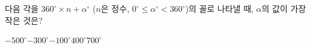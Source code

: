 다음 각을 $360^\circ\times n+\alpha^\circ$ ($n$은 정수, $0^\circ\le\alpha^\circ<360^\circ$)의 꼴로 나타낼 때, $\alpha$의 값이 가장 작은 것은?
\begin{choices32}{$-500^\circ$}{$-300^\circ$}{$-100^\circ$}{$400^\circ$}{$700^\circ$}\end{choices32}
